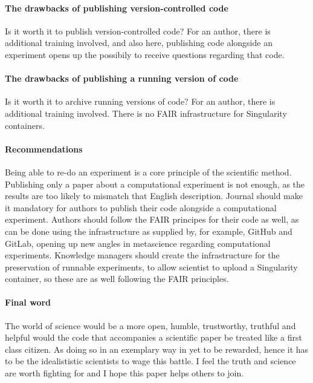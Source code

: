 \paragraph{The drawbacks of publishing version-controlled code}

Is it worth it to publish version-controlled code?
For an author, 
there is additional training involved, and also here,
publishing code alongside an experiment opens up
the possibily to receive questions regarding that code.

\paragraph{The drawbacks of publishing a running version of code}

Is it worth it to archive running versions of code?
For an author, 
there is additional training involved.
There is no FAIR infrastructure for Singularity containers.

\paragraph{Recommendations}

Being able to re-do an experiment is a core principle of the scientific method.
Publishing only a paper about a computational experiment is not enough,
as the results are too likely to mismatch that English description.
Journal should make it mandatory for authors
to publish their code alongside a computational experiment.
Authors should follow the FAIR principes for their code as well,
as can be done using the infrastructure as supplied by, 
for example, GitHub and GitLab, opening up new angles in
metascience regarding computational experiments.
Knowledge managers should create the infrastructure for the preservation
of runnable experiments, to allow scientist to upload a Singularity
container, so these are as well following the FAIR principles.

\paragraph{Final word}

The world of science would be a more open, humble, trustworthy, truthful
and helpful would the code that accompanies a scientific paper
be treated like a first class citizen. As doing so in an exemplary way
in yet to be rewarded, hence it has to be the idealististic scientists
to wage this battle. I feel the truth and science are worth fighting for
and I hope this paper helps others to join.

